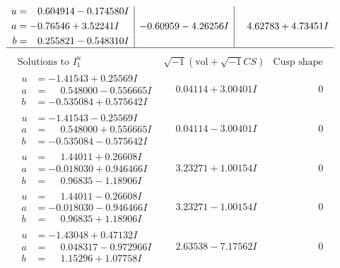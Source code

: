\documentclass[1p]{elsarticle_modified}
\theoremstyle{definition}
\newcommand{\I}{\sqrt{-1}}
\begin{document}
$$\begin{array}{c|c|c}
\begin{aligned}
u &= \phantom{-}0.604914 - 0.174580 I \\
a &= -0.76546 + 3.52241 I \\
b &= \phantom{-}0.255821 - 0.548310 I\end{aligned}
 & -0.60959 - 4.26256 I & \phantom{-}4.62783 + 4.73451 I\\
 \hline 
 \end{array}$$\newpage$$\begin{array}{c|c|c}  
\text{Solutions to }I^u_{1}& \I (\text{vol} + \sqrt{-1}CS) & \text{Cusp shape}\\
 \hline 
\begin{aligned}
u &= -1.41543 + 0.25569 I \\
a &= \phantom{-}0.548000 - 0.556665 I \\
b &= -0.535084 + 0.575642 I\end{aligned}
 & \phantom{-}0.04114 + 3.00401 I & \phantom{-0.000000 } 0 \\ \hline\begin{aligned}
u &= -1.41543 - 0.25569 I \\
a &= \phantom{-}0.548000 + 0.556665 I \\
b &= -0.535084 - 0.575642 I\end{aligned}
 & \phantom{-}0.04114 - 3.00401 I & \phantom{-0.000000 } 0 \\ \hline\begin{aligned}
u &= \phantom{-}1.44011 + 0.26608 I \\
a &= -0.018030 + 0.946466 I \\
b &= \phantom{-}0.96835 - 1.18906 I\end{aligned}
 & \phantom{-}3.23271 + 1.00154 I & \phantom{-0.000000 } 0 \\ \hline\begin{aligned}
u &= \phantom{-}1.44011 - 0.26608 I \\
a &= -0.018030 - 0.946466 I \\
b &= \phantom{-}0.96835 + 1.18906 I\end{aligned}
 & \phantom{-}3.23271 - 1.00154 I & \phantom{-0.000000 } 0 \\ \hline\begin{aligned}
u &= -1.43048 + 0.47132 I \\
a &= \phantom{-}0.048317 - 0.972966 I \\
b &= \phantom{-}1.15296 + 1.07758 I\end{aligned}
 & \phantom{-}2.63538 - 7.17562 I & \phantom{-0.000000 } 0 \\ \hline\begin{aligned}

\end{aligned}
\end{array}$$
\end{document}
